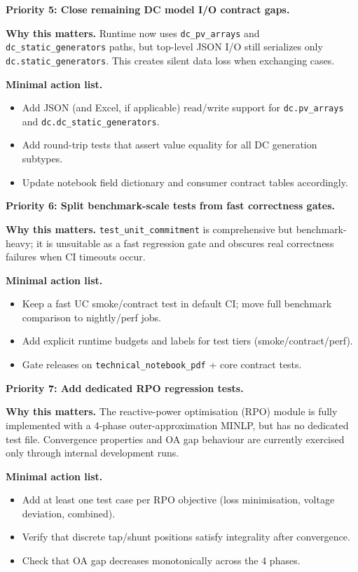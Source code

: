 \textbf{Priority 5: Close remaining DC model I/O contract gaps.}

\textbf{Why this matters.} Runtime now uses \texttt{dc\_pv\_arrays} and
\texttt{dc\_static\_generators} paths, but top-level JSON I/O still serializes only
\texttt{dc.static\_generators}. This creates silent data loss when exchanging cases.

\textbf{Minimal action list.}
\begin{itemize}
  \item Add JSON (and Excel, if applicable) read/write support for \texttt{dc.pv\_arrays} and \texttt{dc.dc\_static\_generators}.
  \item Add round-trip tests that assert value equality for all DC generation subtypes.
  \item Update notebook field dictionary and consumer contract tables accordingly.
\end{itemize}

\textbf{Priority 6: Split benchmark-scale tests from fast correctness gates.}

\textbf{Why this matters.} \texttt{test\_unit\_commitment} is comprehensive but
benchmark-heavy; it is unsuitable as a fast regression gate and obscures real
correctness failures when CI timeouts occur.

\textbf{Minimal action list.}
\begin{itemize}
  \item Keep a fast UC smoke/contract test in default CI; move full benchmark comparison to nightly/perf jobs.
  \item Add explicit runtime budgets and labels for test tiers (smoke/contract/perf).
  \item Gate releases on \texttt{technical\_notebook\_pdf} + core contract tests.
\end{itemize}

\textbf{Priority 7: Add dedicated RPO regression tests.}

\textbf{Why this matters.}  The reactive-power optimisation (RPO) module is
fully implemented with a 4-phase outer-approximation MINLP, but has no
dedicated test file.  Convergence properties and OA gap behaviour are
currently exercised only through internal development runs.

\textbf{Minimal action list.}
\begin{itemize}
  \item Add at least one test case per RPO objective (loss minimisation, voltage deviation, combined).
  \item Verify that discrete tap/shunt positions satisfy integrality after convergence.
  \item Check that OA gap decreases monotonically across the 4 phases.
\end{itemize}

